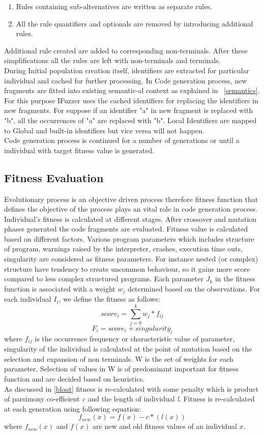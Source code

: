 \documentclass{acm_proc_article-sp}
\begin{document}
\begin{enumerate}
\item Rules containing sub-alternatives are written as separate rules.
\item All the rule quantifiers and optionals are removed by introducing additional rules.
\end{enumerate}
Additional rule created are added to corresponding non-terminals. After these simplifications all the rules are left with non-terminals and terminals.\\
\indent During Initial population creation itself, identifiers are extracted for particular individual and cached for further processing. In Code generation process, new fragments are fitted into existing semantic-al context as explained in ~\autoref{semantics}. For this purpose IFuzzer uses the cached identifiers for replacing the identifiers in new fragments. For suppose if an identifier "a" in new fragment is replaced with "b", all the occurrences of "a" are replaced with "b". Local Identifiers are mapped to Global and built-in identifiers but vice versa will not happen.\\
Code generation process is continued for a number of generations or until a individual with target fitness value is generated. 

\subsection{Fitness Evaluation} \label{fitness}
Evolutionary process is an objective driven process therefore fitness function that defines the objective of the process plays an vital role in code generation process. Individual's fitness is calculated at different stages. After crossover and mutation phases generated the code fragments are evaluated. Fitness value is calculated based on different factors. Various program parameters which includes structure of program, warnings raised by the interpreter, crashes, execution time outs, singularity are considered as fitness parameters. For instance nested (or complex) structure have tendency to create uncommon behaviour, so it gains more score compared to less complex structured programs. Each parameter $J_{k}$ in the fitness function is associated with a weight $w_{j}$ determined based on the observations. For each individual $I_{i}$, we define the fitness as follows:
\[score_{i} = \sum_{j=0}^{k} w_{j} * f_{ij} \]
\[F_{i} = score_{i} + singularity_{i}  \]
where $f_{ij}$ is the occurrence frequency or characteristic value of parameter, singularity of the individual is calculated at the point of mutation based on the selection and expansion of non terminals. W is the set of weights for each parameter. Selection of values in W is of predominant important for fitness function and are decided based on heuristics.\\
\indent As discussed in \autoref{bloat} fitness is re-calculated with some penalty which is product of parsimony co-efficient \textit{c} and the length of individual \textit{l}. Fitness is re-calculated at each generation using following equation:
\[f_{new}(x) = f(x) - c*(l(x))  \]
where $f_{new}(x)$ and $f(x)$ are new and old fitness values of an individual $x$.
\end{document}

